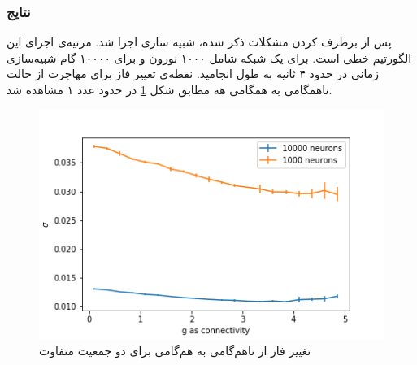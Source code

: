 \documentclass[12pt,onecolumn,a4paper]{article}
\begin{document}
\subsubsection{نتایج }
پس از برطرف کردن مشکلات ذکر شده، شبیه سازی اجرا شد. مرتیه‌ی اجرای این الگورتیم خطی است. برای یک شبکه شامل ۱۰۰۰ نورون و برای ۱۰۰۰۰ گام شبیه‌سازی زمانی در حدود ۴ ثانیه به طول انجامید. نقطه‌ی تغییر فاز برای مهاجرت از حالت ناهمگامی به همگامی هه مطابق شکل \ref{fig:two_pops_sync_rotational} در حدود عدد ۱ مشاهده شد.\\
\begin{figure}
\centering
  \includegraphics[width = 10 cm]{../scripts/rotational_model/two_pops_sigma.png}
 \caption{تغییر فاز از ناهم‌گامی به هم‌گامی برای دو جمعیت متفاوت}
  \label{fig:two_pops_sync_rotational}
\end{figure}


\newpage


\end{document}
